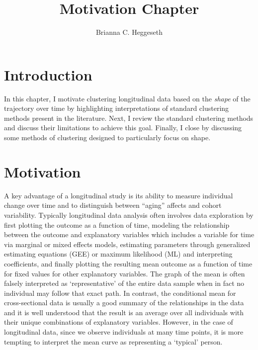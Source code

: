 \documentclass[12pt]{article}
\title{Motivation Chapter}
\author{Brianna C. Heggeseth}
\begin{document}
\doublespace
\maketitle
\section{Introduction}
 In this chapter, I motivate clustering longitudinal data based on the {\em shape} of the trajectory over time by highlighting interpretations of standard clustering methods present in the literature. Next, I review the standard clustering methods and discuss their limitations to achieve this goal. Finally, I close by discussing some methods of clustering designed to particularly focus on shape. 

\section{Motivation}
A key advantage of a longitudinal study is its ability to measure individual change over time and to distinguish between ``aging'' affects and cohort variability. Typically longitudinal data analysis often involves data exploration by first plotting the outcome as a function of time, modeling the relationship between the outcome and explanatory variables which includes a variable for time via marginal or mixed effects models, estimating parameters through generalized estimating equations (GEE) or maximum likelihood (ML) and interpreting coefficients, and finally plotting the resulting mean outcome as a function of time for fixed values for other explanatory variables. The graph of the mean is often falsely interpreted as `representative' of the entire data sample when in fact no individual may follow that exact path. In contrast, the conditional mean for cross-sectional data is usually a good summary of the relationships in the data and it is well understood that the result is an average over all individuals with their unique combinations of explanatory variables. However, in the case of longitudinal data, since we observe individuals at many time points, it is more tempting to interpret the mean curve as representing a `typical' person. \\\\
\end{document}
